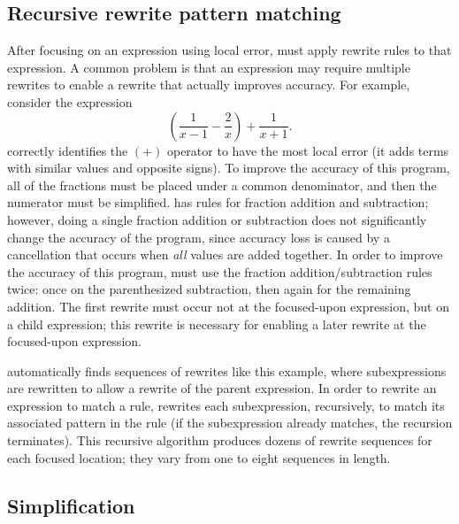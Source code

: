 \documentclass[paper.tex]{subfiles}
\begin{document}
\subsection{Recursive rewrite pattern matching}

After focusing on an expression using local error,
  \casio must apply rewrite rules to that expression.
A common problem is that an expression may require multiple rewrites
  to enable a rewrite that actually improves accuracy.
For example, consider the expression
\[
 \left(\frac{1}{x-1} - \frac{2}{x} \right) + \frac{1}{x+1}.
\]
\casio correctly identifies the $(+)$ operator
  to have the most local error
  (it adds terms with similar values and opposite signs).
To improve the accuracy of this program,
  all of the fractions must be placed under a common denominator,
  and then the numerator must be simplified.
\casio has rules for fraction addition and subtraction;
  however, doing a single fraction addition or subtraction
  does not significantly change the accuracy of the program,
  since accuracy loss is caused by a cancellation
  that occurs when \emph{all} values are added together.
In order to improve the accuracy of this program,
  \casio must use the fraction addition/subtraction rules twice:
  once on the parenthesized subtraction,
  then again for the remaining addition.
The first rewrite must occur not at the focused-upon expression,
  but on a child expression;
  this rewrite is necessary for enabling a later rewrite
  at the focused-upon expression.

\casio automatically finds sequences of rewrites like this example,
  where subexpressions are rewritten
  to allow a rewrite of the parent expression.
In order to rewrite an expression to match a rule,
  \casio rewrites each subexpression, recursively,
  to match its associated pattern in the rule
  (if the subexpression already matches, the recursion terminates).
This recursive algorithm produces dozens of rewrite sequences
  for each focused location; they vary from one to eight sequences in length.

\subsection{Simplification}
\end{document}
